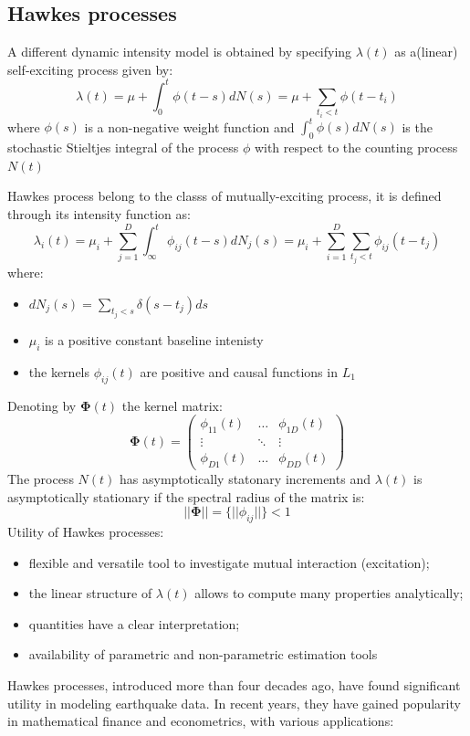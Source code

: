 \subsection{Hawkes processes}
A different dynamic intensity model is obtained by specifying $\lambda(t)$ as a(linear) self-exciting process given by:
\[
\lambda(t) = \mu + \int_0^t \phi(t-s)dN(s) = \mu + \sum_{t_i <t} \phi(t-t_i)
\]
where $\phi(s)$ is a non-negative weight function and $\int_0^t \phi(s)dN(s)$ is the stochastic Stieltjes integral of the process $\phi$ with respect to the counting process $N(t)$
\begin{mytheorem}
	Hawkes process belong to the classs of mutually-exciting process, it is defined through its intensity function as:
	\[
	\lambda_i(t) = \mu_i + \sum_{j=1}^D \int_\infty^t \phi_{ij}(t-s)dN_j(s) = \mu_i + \sum_{i=1}^D \sum_{t_j<t} \phi_{ij}(t-t_j)
	\]
where:
\begin{itemize}
	\item $dN_j(s) = \sum_{t_j<s} \delta(s-t_j)ds$
	\item $\mu_i$ is a positive constant baseline intenisty
	\item the kernels $\phi_{ij}(t)$ are positive and causal functions in $L_1$
\end{itemize}
\end{mytheorem}
Denoting by $\mathbf{\Phi}(t)$ the kernel matrix:
\[
\mathbf{\Phi}(t) = \begin{pmatrix}
	\phi_{11}(t) & \ldots & \phi_{1D}(t) \\
	\vdots & \ddots & \vdots\\
	\phi_{D1}(t) & \ldots & \phi_{DD}(t)
\end{pmatrix}
\]
The process $N(t)$ has asymptotically statonary increments and $\lambda(t)$ is asymptotically stationary if the spectral radius of the matrix is:
\[
||\mathbf{\Phi}|| = \{||\phi_{ij}||\}<1 
\]
Utility of Hawkes processes:
\begin{itemize}
\item flexible and versatile tool to investigate mutual interaction (excitation); 
\item the linear structure of $\lambda(t)$ allows to compute many properties analytically; 
\item quantities have a clear interpretation;
\item availability of parametric and non-parametric estimation tools
\end{itemize}
\newpage
Hawkes processes, introduced more than four decades ago, have found significant utility in modeling earthquake data. In recent years, they have gained popularity in mathematical finance and econometrics, with various applications:
